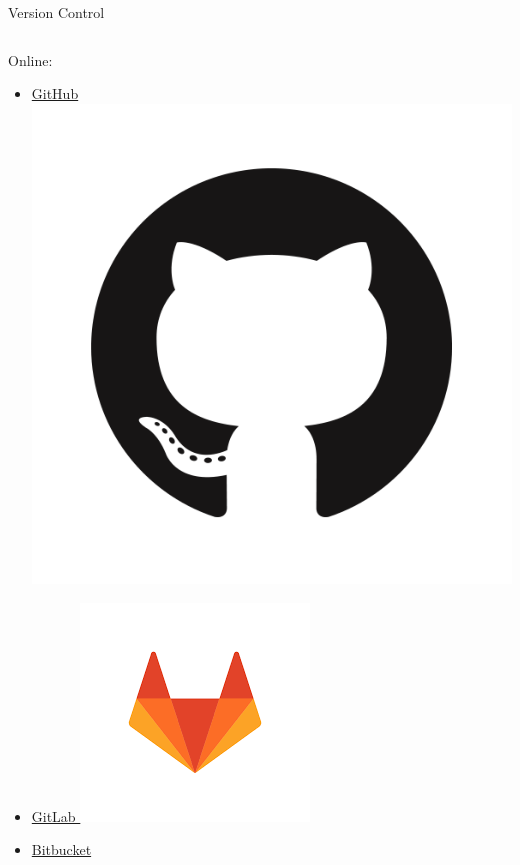 \documentclass{beamer} %
\begin{document}
\begin{frame}{Version Control}
\begin{columns}
      \begin{column}[t]{0.5\textwidth}
        Online:
        \begin{itemize}
          \item \href{https://github.com/}{GitHub \includegraphics[height=.05\textheight]{github.png}}
          \item \href{https://gitlab.com/}{GitLab \includegraphics[height=.05\textheight]{gitlab.png}}
          \item \href{https://bitbucket.org/}{Bitbucket}
        \end{itemize}
      \end{column}  
    \end{columns}
  \end{frame}
\end{document}
